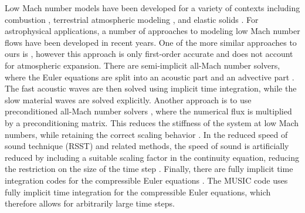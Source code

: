Low Mach number models 
have been developed for a variety of contexts
including combustion \citep{day2000numerical}, terrestrial atmospheric
modeling \citep{durran:1989,oneill:2014,duarte2015low}, and elastic
solids \citep{abbate2017all}.  
For astrophysical applications, a
number of approaches to modeling low Mach number flows have been
developed in recent years.  One of the more similar approaches to ours is
\cite{Lin:2006}, however this approach is only first-order accurate and does
not account for atmospheric expansion.
There are  semi-implicit all-Mach
number solvers, where the Euler equations are split into an acoustic
part and an advective part
\citep{Kwatra2009,Degond2009,Cordier2012,Haack2012,Happenhofer2013,Chalons2016,Padioleau2019}.
The fast acoustic waves are then solved using implicit time
integration, while the slow material waves are solved explicitly.
Another approach is to use preconditioned all-Mach number solvers
\citep{Miczek2014,Barsukow2016}, where the numerical flux is
multiplied by a preconditioning matrix.  This reduces the stiffness of
the system at low Mach numbers, while retaining the correct scaling
behavior .
In the reduced speed of sound technique (RSST) and related
methods, the speed of sound is artificially reduced by including a
suitable scaling factor in the continuity equation, reducing the
restriction on the size of the time step
\citep{Rempel2005,Hotta2012,Wang2015,Takeyama2017,Iijima2018}.
Finally, there are fully implicit time integration codes for the
compressible Euler equations
\citep{kifonidis:2012,Viallet2015,Goffrey2016}.
The MUSIC code
uses fully implicit time integration for the compressible Euler
equations, which therefore allows for arbitrarily large time steps.

